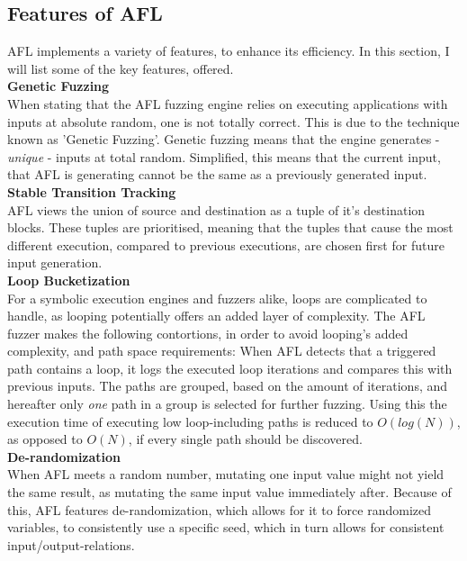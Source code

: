 \documentclass[a4paper]{article}
\newcommand{\tbf}[1]{\textbf{#1}}
\newcommand{\tit}[1]{\textit{#1}}
\newcommand{\subsubsubsection}[1]{\tbf{#1}\\}
\begin{document}
\subsection{Features of AFL}
AFL implements a variety of features, to enhance its efficiency. In this section, I will list some of the key features, offered.\\
\subsubsubsection{Genetic Fuzzing}
When stating that the AFL fuzzing engine relies on executing applications with inputs at absolute random, one is not totally correct. This is due to the technique known as 'Genetic Fuzzing'. Genetic fuzzing means that the engine generates - \tit{unique} - inputs at total random. Simplified, this means that the current input, that AFL is generating cannot be the same as a previously generated input.\\
\subsubsubsection{Stable Transition Tracking}
AFL views the union of source and destination as a tuple of it's destination blocks. These tuples are prioritised, meaning that the tuples that cause the most different execution, compared to previous executions, are chosen first for future input generation.\\
\subsubsubsection{Loop Bucketization}
For a symbolic execution engines and fuzzers alike, loops are complicated to handle, as looping potentially offers an added layer of complexity. The AFL fuzzer makes the following contortions, in order to avoid looping's added complexity, and path space requirements:
When AFL detects that a triggered path contains a loop, it logs the executed loop iterations and compares this with previous inputs. The paths are grouped, based on the amount of iterations, and hereafter only \tit{one} path in a group is selected for further fuzzing. Using this the execution time of executing low loop-including paths is reduced to $O(log(N))$, as opposed to $O(N)$, if every single path should be discovered.\\
\subsubsubsection{De-randomization}
When AFL meets a random number, mutating one input value might not yield the same result, as mutating the same input value immediately after. Because of this, AFL features de-randomization, which allows for it to force randomized variables, to consistently use a specific seed, which in turn allows for consistent input/output-relations.
\newpage
\end{document}
